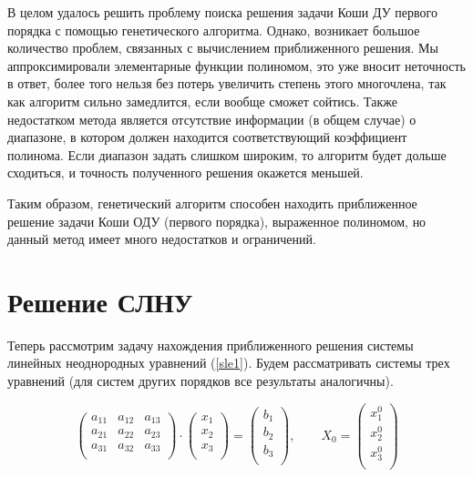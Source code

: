 \documentclass[12pt, a4paper]{article}
\begin{document}
    В целом удалось решить проблему поиска решения задачи Коши ДУ первого 
    порядка с помощью генетического алгоритма. Однако, возникает большое 
    количество проблем, связанных с вычислением приближенного решения. Мы 
    аппроксимировали элементарные функции полиномом, это уже вносит 
    неточность в ответ, более того нельзя без потерь увеличить степень этого 
    многочлена, так как алгоритм сильно замедлится, если вообще сможет 
    сойтись. Также недостатком метода является отсутствие информации (в 
    общем случае) о диапазоне, в котором должен находится соответствующий 
    коэффициент полинома. Если диапазон задать слишком широким, то алгоритм 
    будет дольше сходиться, и точность полученного решения окажется меньшей.
    
    Таким образом, генетический алгоритм способен находить приближенное 
    решение задачи Коши ОДУ (первого порядка), выраженное полиномом, но 
    данный метод имеет много недостатков и ограничений. 
    
    \section{Решение СЛНУ}
    
    Теперь рассмотрим задачу нахождения приближенного решения системы 
    линейных неоднородных уравнений (\ref{sle1}). Будем рассматривать 
    системы трех уравнений (для систем других порядков все результаты 
    аналогичны).
    
    \begin{equation}
        \left(
        \begin{array} {ccc}
            a_{11} & a_{12} & a_{13} \\
            a_{21} & a_{22} & a_{23} \\
            a_{31} & a_{32} & a_{33} \\
        \end{array}
        \right)
        \cdot
        \left(
        \begin{array} {ccc}
            x_{1} \\
            x_{2} \\
            x_{3} \\
        \end{array}
        \right)
        =
        \left(
        \begin{array} {ccc}
            b_{1} \\
            b_{2} \\
            b_{3} \\
        \end{array}
        \right), 
        \qquad
        X_{0} =
        \left(
        \begin{array} {ccc}
            x^{0}_{1} \\
            x^{0}_{2} \\
            x^{0}_{3} \\
        \end{array}
        \right)
        \label{sle1}
    \end{equation}
    
\end{document}
